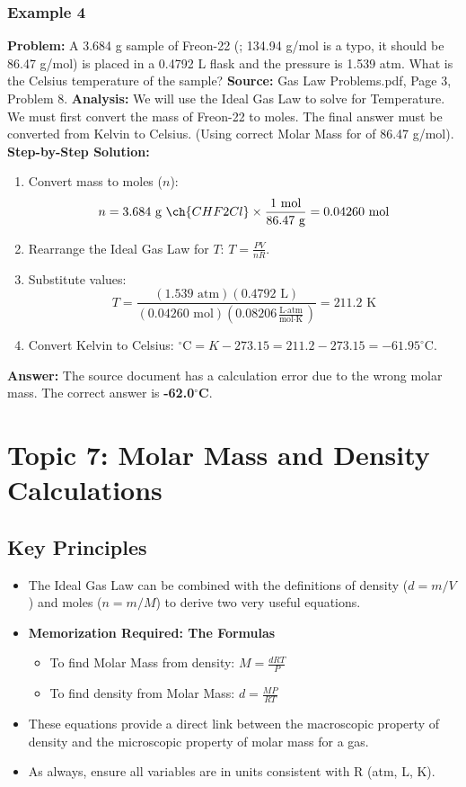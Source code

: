 \documentclass{article}
\begin{document}
\subsubsection{Example 4}
\textbf{Problem:} A 3.684 g sample of Freon-22 (; 134.94 g/mol is a typo, it should be 86.47 g/mol) is placed in a 0.4792 L flask and the pressure is 1.539 atm. What is the Celsius temperature of the sample?
\textbf{Source:} Gas Law Problems.pdf, Page 3, Problem 8.
\textbf{Analysis:} We will use the Ideal Gas Law to solve for Temperature. We must first convert the mass of Freon-22 to moles. The final answer must be converted from Kelvin to Celsius. (Using correct Molar Mass for  of 86.47 g/mol).
\textbf{Step-by-Step Solution:}
\begin{enumerate}
    \item Convert mass to moles ($n$):
    \[ n = 3.684 \text{ g } \ch{CHF2Cl} \times \frac{1 \text{ mol}}{86.47 \text{ g}} = 0.04260 \text{ mol} \]
    \item Rearrange the Ideal Gas Law for $T$: $T = \frac{PV}{nR}$.
    \item Substitute values:
    \[ T = \frac{(1.539 \text{ atm})(0.4792 \text{ L})}{(0.04260 \text{ mol})(0.08206 \frac{\text{L}\cdot\text{atm}}{\text{mol}\cdot\text{K}})} = 211.2 \text{ K} \]
    \item Convert Kelvin to Celsius: $^\circ\text{C} = K - 273.15 = 211.2 - 273.15 = -61.95^\circ$C.
\end{enumerate}
\textbf{Answer:} The source document has a calculation error due to the wrong molar mass. The correct answer is \textbf{-62.0$^\circ$C}.

\section{Topic 7: Molar Mass and Density Calculations}
\subsection{Key Principles}
\begin{itemize}
    \item The Ideal Gas Law can be combined with the definitions of density ($d = m/V$) and moles ($n=m/M$) to derive two very useful equations.
    \item \textbf{Memorization Required: The Formulas}
        \begin{itemize}
            \item To find Molar Mass from density: $M = \frac{dRT}{P}$
            \item To find density from Molar Mass: $d = \frac{MP}{RT}$
        \end{itemize}
    \item These equations provide a direct link between the macroscopic property of density and the microscopic property of molar mass for a gas.
    \item As always, ensure all variables are in units consistent with R (atm, L, K).
\end{itemize}
\end{document}
